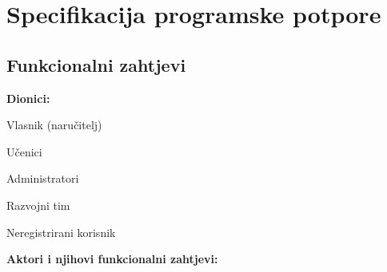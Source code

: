 \chapter{Specifikacija programske potpore}
		
\section{Funkcionalni zahtjevi}

\noindent \textbf{Dionici:}
			
\begin{packed_enum}
	
	\item Vlasnik (naručitelj)
	\item Učenici				
	\item Administratori
	\item Razvojni tim
	\item Neregistrirani korisnik
	
\end{packed_enum}

\noindent \textbf{Aktori i njihovi funkcionalni zahtjevi:}
			
